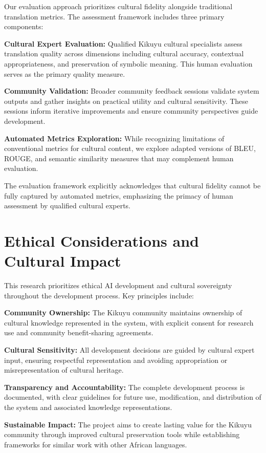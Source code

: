 \documentclass[
]{ceurart}
\begin{document}
Our evaluation approach prioritizes cultural fidelity alongside traditional translation metrics. The assessment framework includes three primary components:

\textbf{Cultural Expert Evaluation:} Qualified Kikuyu cultural specialists assess translation quality across dimensions including cultural accuracy, contextual appropriateness, and preservation of symbolic meaning. This human evaluation serves as the primary quality measure.

\textbf{Community Validation:} Broader community feedback sessions validate system outputs and gather insights on practical utility and cultural sensitivity. These sessions inform iterative improvements and ensure community perspectives guide development.

\textbf{Automated Metrics Exploration:} While recognizing limitations of conventional metrics for cultural content, we explore adapted versions of BLEU, ROUGE, and semantic similarity measures that may complement human evaluation.

The evaluation framework explicitly acknowledges that cultural fidelity cannot be fully captured by automated metrics, emphasizing the primacy of human assessment by qualified cultural experts.

\section{Ethical Considerations and Cultural Impact}

This research prioritizes ethical AI development and cultural sovereignty throughout the development process. Key principles include:

\textbf{Community Ownership:} The Kikuyu community maintains ownership of cultural knowledge represented in the system, with explicit consent for research use and community benefit-sharing agreements.

\textbf{Cultural Sensitivity:} All development decisions are guided by cultural expert input, ensuring respectful representation and avoiding appropriation or misrepresentation of cultural heritage.

\textbf{Transparency and Accountability:} The complete development process is documented, with clear guidelines for future use, modification, and distribution of the system and associated knowledge representations.

\textbf{Sustainable Impact:} The project aims to create lasting value for the Kikuyu community through improved cultural preservation tools while establishing frameworks for similar work with other African languages.
\end{document}
